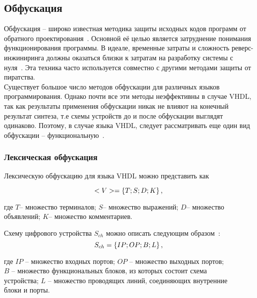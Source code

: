\subsection{Обфускация}
\label{page:domain:obfucation}
Обфускация -- широко известная методика защиты исходных кодов программ от обратного проектирования~\cite{collberg}. Основной её целью является затруднение понимания функционирования программы. В идеале, временные затраты и сложность реверс-инжиниринга должны оказаться близки к затратам на разработку системы с нуля~\cite{sergeichik_ivaniuk}.
Эта техника часто используется совместно с другими методами защиты от пиратства.\\
Существует большое число методов обфускации для различных языков программирования. Однако почти все эти методы неэффективны в случае VHDL, так как результаты применения обфускации никак не влияют на конечный результат синтеза, т.е схемы устройств до и после обфускации выглядят одинаково. Поэтому, в случае языка VHDL, следует рассматривать еще один вид обфускации -- функциональную~\cite{ivaniuk}.

\subsubsection{Лексическая обфускация}
\label{page:domain:lexical}

Лексическую обфускацию для языка VHDL можно представить как

\begin{equation}
  <V> = \{T;S;D;K\} \text{\,,}
  \label{eq:domain:lexical:view}
\end{equation}
\begin{explanation}
  где $T$-- множество терминалов; $S$-- множество выражений; $D$-- множество\\ объявлений; $K$-- множество комментариев.
\end{explanation}
Схему цифрового устройства $S_{ch}$ можно описать следующим образом~\cite{ivaniuk}:
\begin{equation}
  S_{ch}= \{IP;OP;B;L\} \text{\,,}
  \label{eq:domain:lexical:schema}
\end{equation}
\begin{explanation}
  где $IP$ -- множество входных портов; $OP$ -- множество выходных портов;\\$B$ -- множество функциональных блоков, из которых состоит схема\\ устройства; $L$ -- множество проводящих линий, соединяющих внутренние\\ блоки и порты.
\end{explanation}

